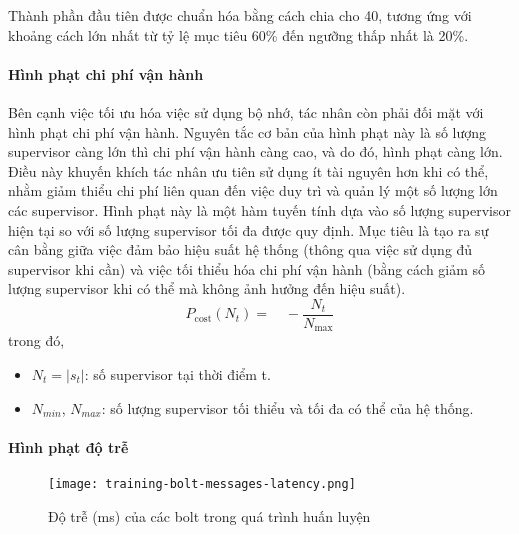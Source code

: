 Thành phần đầu tiên được chuẩn hóa bằng cách chia cho 40, tương ứng với khoảng cách lớn nhất từ tỷ lệ mục tiêu 60\% đến ngưỡng thấp nhất là 20\%.

\paragraph{Hình phạt chi phí vận hành}

Bên cạnh việc tối ưu hóa việc sử dụng bộ nhớ, tác nhân còn phải đối mặt với hình phạt chi phí vận hành. Nguyên tắc cơ bản của hình phạt này là số lượng supervisor càng lớn thì chi phí vận hành càng cao, và do đó, hình phạt càng lớn. Điều này khuyến khích tác nhân ưu tiên sử dụng ít tài nguyên hơn khi có thể, nhằm giảm thiểu chi phí liên quan đến việc duy trì và quản lý một số lượng lớn các supervisor. Hình phạt này là một hàm tuyến tính dựa vào số lượng supervisor hiện tại so với số lượng supervisor tối đa được quy định. Mục tiêu là tạo ra sự cân bằng giữa việc đảm bảo hiệu suất hệ thống (thông qua việc sử dụng đủ supervisor khi cần) và việc tối thiểu hóa chi phí vận hành (bằng cách giảm số lượng supervisor khi có thể mà không ảnh hưởng đến hiệu suất).
\begin{equation}
    P_{\text{cost}}(N_t) = \quad -\frac{N_t}{N_{\max}}
\end{equation}
trong đó,
\begin{itemize}
    \item $N_t = |s_t|$: số supervisor tại thời điểm t.
    \item $N_{min}$, $N_{max}$: số lượng supervisor tối thiểu và tối đa có thể của hệ thống.
\end{itemize}

\paragraph{Hình phạt độ trễ}

\begin{figure}
    \centering
    \texttt{[image: training-bolt-messages-latency.png]}
    \caption{Độ trễ (ms) của các bolt trong quá trình huấn luyện}
    \label{fig:training-bolt-latency}
\end{figure}

